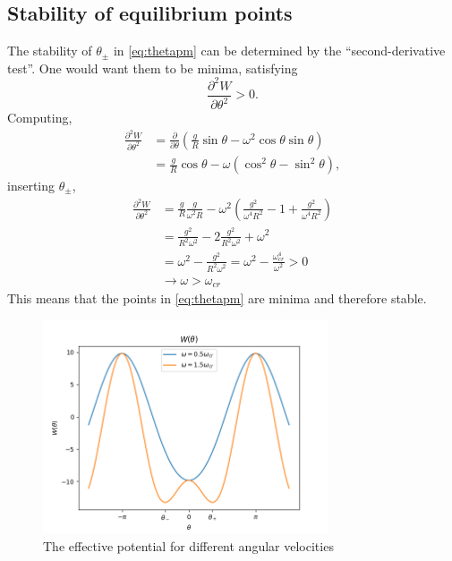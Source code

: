 \documentclass[11pt]{amsart}
\begin{document}
\subsection{Stability of equilibrium points}
The stability of $\theta_\pm$ in \ref{eq:thetapm} can be determined by the ``second-derivative test''. One would want them to be minima, satisfying
\begin{equation*}
\frac{\partial^2 W}{\partial \theta^2} > 0.
\end{equation*}
Computing,
\begin{align*}
\frac{\partial^2 W}{\partial \theta^2} 
&= \frac{\partial}{\partial \theta} \left(\frac{g}{R}\sin\theta - \omega^2\cos\theta\sin\theta \right)\\
&= \frac{g}{R}\cos\theta - \omega(\cos^2\theta-\sin^2\theta),
\end{align*}
inserting $\theta_\pm$,
\begin{align*}
\frac{\partial^2 W}{\partial \theta^2} 
&= \frac{g}{R}\frac{g}{\omega^2R}-\omega^2\left(\frac{g^2}{\omega^4R^2} - 1 + \frac{g^2}{\omega^4R^2} \right) \\
&= \frac{g^2}{R^2\omega^2} - 2\frac{g^2}{R^2\omega^2} + \omega^2 \\
&=\omega^2 - \frac{g^2}{R^2\omega^2} = \omega^2 - \frac{\omega_{cr}^4}{\omega^2} > 0\\
&\rightarrow \omega > \omega_{cr}
\end{align*}
This means that the points in \ref{eq:thetapm} are minima and therefore stable.

\begin{figure}
\centering
	\includegraphics[width=0.75\textwidth]{critical_omega.png}
	\caption{The effective potential for different angular velocities}
	\label{fig:angvel}
\end{figure}
\end{document}
